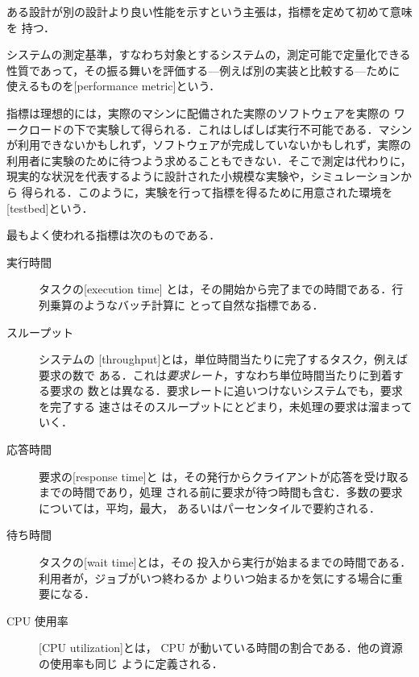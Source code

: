 \documentclass[../main.tex]{subfiles}
\begin{document}
ある設計が別の設計より良い性能を示すという主張は，指標を定めて初めて意味を
持つ．

\begin{definition}[性能指標]
  システムの測定基準，すなわち対象とするシステムの，測定可能で定量化できる
  性質であって，その振る舞いを評価する---例えば別の実装と比較する---ために
  使えるものを[performance metric]という．
\end{definition}

指標は理想的には，実際のマシンに配備された実際のソフトウェアを実際の
ワークロードの下で実験して得られる．これはしばしば実行不可能である．マシン
が利用できないかもしれず，ソフトウェアが完成していないかもしれず，実際の
利用者に実験のために待つよう求めることもできない．そこで測定は代わりに，
現実的な状況を代表するように設計された小規模な実験や，シミュレーションから
得られる．このように，実験を行って指標を得るために用意された環境を
[testbed]という．

最もよく使われる指標は次のものである．
\begin{description}
  \item[実行時間] タスクの[execution time]
    とは，その開始から完了までの時間である．行列乗算のようなバッチ計算に
    とって自然な指標である．
  \item[スループット] システムの%
    [throughput]とは，単位時間当たりに完了するタスク，例えば要求の数で
    ある．これは\emph{要求レート}，すなわち単位時間当たりに到着する要求の
    数とは異なる．要求レートに追いつけないシステムでも，要求を完了する
    速さはそのスループットにとどまり，未処理の要求は溜まっていく．
  \item[応答時間] 要求の[response time]と
    は，その発行からクライアントが応答を受け取るまでの時間であり，処理
    される前に要求が待つ時間も含む．多数の要求については，平均，最大，
    あるいはパーセンタイルで要約される．
  \item[待ち時間] タスクの[wait time]とは，その
    投入から実行が始まるまでの時間である．利用者が，ジョブがいつ終わるか
    よりいつ始まるかを気にする場合に重要になる．
  \item[CPU 使用率] [CPU utilization]とは，
    CPU が動いている時間の割合である．他の資源の使用率も同じ
    ように定義される．
\end{description}
\end{document}
